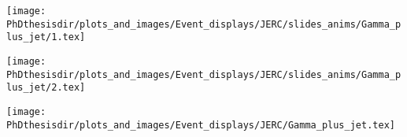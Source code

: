 \begin{frame}
\begin{center}
\texttt{[image: \\PhDthesisdir/plots\_and\_images/Event\_displays/JERC/slides\_anims/Gamma\_plus\_jet/1.tex]}
\end{center}
\end{frame}

\begin{frame}
\addtocounter{framenumber}{-1}
\transboxout
{}
\begin{center}
\texttt{[image: \\PhDthesisdir/plots\_and\_images/Event\_displays/JERC/slides\_anims/Gamma\_plus\_jet/2.tex]}
\end{center}
\end{frame}

\begin{frame}
\addtocounter{framenumber}{-1}
\transdissolve
\begin{center}
\texttt{[image: \\PhDthesisdir/plots\_and\_images/Event\_displays/JERC/Gamma\_plus\_jet.tex]}
\end{center}
\end{frame}